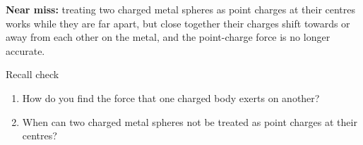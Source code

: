 \documentclass[11pt]{article}
\begin{document}
\begin{keepsection}
\begin{notebox}\textbf{Near miss:} treating two charged metal spheres as point charges at their centres works while they are far apart, but close together their charges shift towards or away from each other on the metal, and the point-charge force is no longer accurate.\end{notebox}

\begin{recallbox}{Recall check}
\begin{enumerate}
\item How do you find the force that one charged body exerts on another?
\item When can two charged metal spheres not be treated as point charges at their centres?
\end{enumerate}

\end{recallbox}
\end{keepsection}
\end{document}
